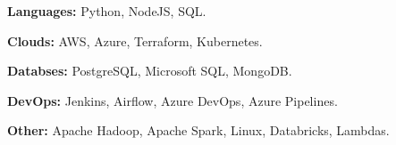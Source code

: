 

\textbf{Languages:} Python, NodeJS, SQL.

\textbf{Clouds:} AWS, Azure, Terraform, Kubernetes.

\textbf{Databses:} PostgreSQL, Microsoft SQL, MongoDB.

\textbf{DevOps:} Jenkins, Airflow, Azure DevOps, Azure Pipelines.

\textbf{Other:} Apache Hadoop, Apache Spark, Linux, Databricks, Lambdas.